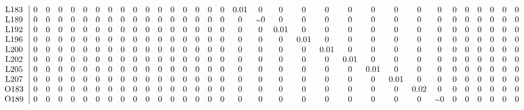 \begin{table}[H]
\begin{center}
\begin{math}
\begin{array}{c|cccccccccccccccccccccccccccccccc}
\mathrm{L183} \hspace*{2pt} &  0 &  0 &  0 &  0 &  0 &  0 &  0 &  0 &  0 &  0 &  0 &  0 &  0 &  0 &  0 &  0 &       0.01 &  0 &  0 &  0 &  0 &  0 &  0 &  0 &  0 &  0 &  0 &  0 &  0 &  0 &  0 &  0 \\
\mathrm{L189} \hspace*{2pt} &  0 &  0 &  0 &  0 &  0 &  0 &  0 &  0 &  0 &  0 &  0 &  0 &  0 &  0 &  0 &  0 &  0 &  {\scriptstyle \sim }0 &  0 &  0 &  0 &  0 &  0 &  0 &  0 &  0 &  0 &  0 &  0 &  0 &  0 &  0 \\
\mathrm{L192} \hspace*{2pt} &  0 &  0 &  0 &  0 &  0 &  0 &  0 &  0 &  0 &  0 &  0 &  0 &  0 &  0 &  0 &  0 &  0 &  0 &       0.01 &  0 &  0 &  0 &  0 &  0 &  0 &  0 &  0 &  0 &  0 &  0 &  0 &  0 \\
\mathrm{L196} \hspace*{2pt} &  0 &  0 &  0 &  0 &  0 &  0 &  0 &  0 &  0 &  0 &  0 &  0 &  0 &  0 &  0 &  0 &  0 &  0 &  0 &       0.01 &  0 &  0 &  0 &  0 &  0 &  0 &  0 &  0 &  0 &  0 &  0 &  0 \\
\mathrm{L200} \hspace*{2pt} &  0 &  0 &  0 &  0 &  0 &  0 &  0 &  0 &  0 &  0 &  0 &  0 &  0 &  0 &  0 &  0 &  0 &  0 &  0 &  0 &       0.01 &  0 &  0 &  0 &  0 &  0 &  0 &  0 &  0 &  0 &  0 &  0 \\
\mathrm{L202} \hspace*{2pt} &  0 &  0 &  0 &  0 &  0 &  0 &  0 &  0 &  0 &  0 &  0 &  0 &  0 &  0 &  0 &  0 &  0 &  0 &  0 &  0 &  0 &       0.01 &  0 &  0 &  0 &  0 &  0 &  0 &  0 &  0 &  0 &  0 \\
\mathrm{L205} \hspace*{2pt} &  0 &  0 &  0 &  0 &  0 &  0 &  0 &  0 &  0 &  0 &  0 &  0 &  0 &  0 &  0 &  0 &  0 &  0 &  0 &  0 &  0 &  0 &       0.01 &  0 &  0 &  0 &  0 &  0 &  0 &  0 &  0 &  0 \\
\mathrm{L207} \hspace*{2pt} &  0 &  0 &  0 &  0 &  0 &  0 &  0 &  0 &  0 &  0 &  0 &  0 &  0 &  0 &  0 &  0 &  0 &  0 &  0 &  0 &  0 &  0 &  0 &       0.01 &  0 &  0 &  0 &  0 &  0 &  0 &  0 &  0 \\
\mathrm{O183} \hspace*{2pt} &  0 &  0 &  0 &  0 &  0 &  0 &  0 &  0 &  0 &  0 &  0 &  0 &  0 &  0 &  0 &  0 &  0 &  0 &  0 &  0 &  0 &  0 &  0 &  0 &       0.02 &  0 &  0 &  0 &  0 &  0 &  0 &  0 \\
\mathrm{O189} \hspace*{2pt} &  0 &  0 &  0 &  0 &  0 &  0 &  0 &  0 &  0 &  0 &  0 &  0 &  0 &  0 &  0 &  0 &  0 &  0 &  0 &  0 &  0 &  0 &  0 &  0 &  0 &  {\scriptstyle \sim }0 &  0 &  0 &  0 &  0 &  0 &  0 \\

\end{array}
\end{math}
\end{center}
\end{table}
